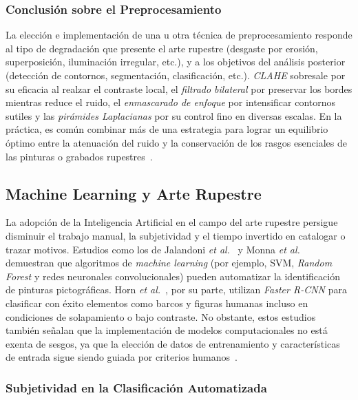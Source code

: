 \subsubsection*{Conclusión sobre el Preprocesamiento}

La elección e implementación de una u otra técnica de preprocesamiento responde al tipo de degradación que presente el arte rupestre (desgaste por erosión, superposición, iluminación irregular, etc.), y a los objetivos del análisis posterior (detección de contornos, segmentación, clasificación, etc.).
\textit{CLAHE} sobresale por su eficacia al realzar el contraste local, el \textit{filtrado bilateral} por preservar los bordes mientras reduce el ruido, el \textit{enmascarado de enfoque} por intensificar contornos sutiles y las \textit{pirámides Laplacianas} por su control fino en diversas escalas.
En la práctica, es común combinar más de una estrategia para lograr un equilibrio óptimo entre la atenuación del ruido y la conservación de los rasgos esenciales de las pinturas o grabados rupestres~\cite{xiao2020,li2022}.

\subsection{Machine Learning y Arte Rupestre}

La adopción de la Inteligencia Artificial en el campo del arte rupestre persigue disminuir el trabajo manual, la subjetividad y el tiempo invertido en catalogar o trazar motivos.
Estudios como los de Jalandoni \textit{et al.}~\cite{jalandoni2022} y Monna \textit{et al.}~\cite{monna2022} demuestran que algoritmos de \textit{machine learning} (por ejemplo, SVM, \textit{Random Forest} y redes neuronales convolucionales) pueden automatizar la identificación de pinturas pictográficas.
Horn \textit{et al.}~\cite{horn2022}, por su parte, utilizan \textit{Faster R-CNN} para clasificar con éxito elementos como barcos y figuras humanas incluso en condiciones de solapamiento o bajo contraste.
No obstante, estos estudios también señalan que la implementación de modelos computacionales no está exenta de sesgos, ya que la elección de datos de entrenamiento y características de entrada sigue siendo guiada por criterios humanos~\cite{horn2022}.

\subsubsection*{Subjetividad en la Clasificación Automatizada}

